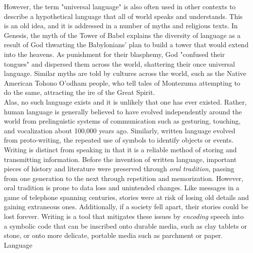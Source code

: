 
However, the term "universal language" is also often used in other contexts to describe a hypothetical language that all of world speaks and understands. This is an old idea, and it is addressed in a number of myths and religious texts. In Genesis, the myth of the Tower of Babel explains the diversity of language as a result of God thwarting the Babylonians' plan to build a tower that would extend into the heavens. As punishment for their blasphemy, God "confused their tongues" and dispersed them across the world, shattering their once universal language. Similar myths are told by cultures across the world, such as the Native American Tohono O'odham people, who tell tales of Montezuma attempting to do the same, attracting the ire of the Great Spirit. \\

Alas, no such language exists and it is unlikely that one has ever existed. Rather, human language is generally believed to have evolved independently around the world from prelinguistic systems of communication such as gesturing, touching, and vocalization about 100,000 years ago. Similarly, written language evolved from proto-writing, the repeated use of symbols to identify objects or events. \\

Writing is distinct from speaking in that it is a reliable method of storing and transmitting information. Before the invention of written language, important pieces of history and literature were preserved through \textit{oral tradition}, passing from one generation to the next through repetition and memorization. However, oral tradition is prone to data loss and unintended changes. Like messages in a game of telephone spanning centuries, stories were at risk of losing old details and gaining extraneous ones. Additionally, if a society fell apart, their stories could be lost forever. Writing is a tool that mitigates these issues by \textit{encoding} speech into a symbolic code that can be inscribed onto durable media, such as clay tablets or stone, or onto more delicate, portable media such as parchment or paper. \\

Language  \\


